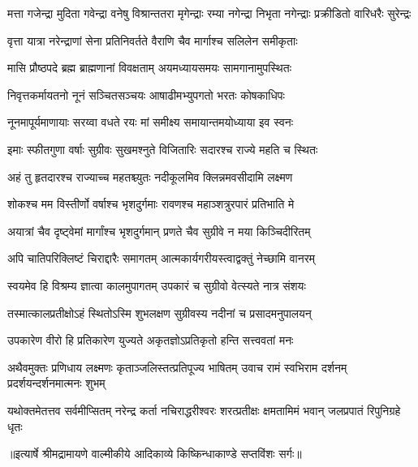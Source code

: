 \fourlineindentedshloka
{मत्ता गजेन्द्रा मुदिता गवेन्द्रा}
{वनेषु विश्रान्ततरा मृगेन्द्राः}
{रम्या नगेन्द्रा निभृता नगेन्द्राः}
{प्रक्रीडितो वारिधरैः सुरेन्द्रः} %

\twolineshloka
{वृत्ता यात्रा नरेन्द्राणां सेना प्रतिनिवर्तते}
{वैराणि चैव मार्गाश्च सलिलेन समीकृताः} %

\twolineshloka
{मासि प्रौष्ठपदे ब्रह्म ब्राह्मणानां विवक्षताम्}
{अयमध्यायसमयः सामगानामुपस्थितः} %

\twolineshloka
{निवृत्तकर्मायतनो नूनं सञ्चितसञ्चयः}
{आषाढीमभ्युपगतो भरतः कोषकाधिपः} %

\twolineshloka
{नूनमापूर्यमाणायाः सरय्वा वधते रयः}
{मां समीक्ष्य समायान्तमयोध्याया इव स्वनः} %

\twolineshloka
{इमाः स्फीतगुणा वर्षाः सुग्रीवः सुखमश्नुते}
{विजितारिः सदारश्च राज्ये महति च स्थितः} %

\twolineshloka
{अहं तु हृतदारश्च राज्याच्च महतश्च्युतः}
{नदीकूलमिव क्लिन्नमवसीदामि लक्ष्मण} %

\twolineshloka
{शोकश्च मम विस्तीर्णो वर्षाश्च भृशदुर्गमाः}
{रावणश्च महाञ्शत्रुरपारं प्रतिभाति मे} %

\twolineshloka
{अयात्रां चैव दृष्ट्वेमां मार्गांश्च भृशदुर्गमान्}
{प्रणते चैव सुग्रीवे न मया किञ्चिदीरितम्} %

\twolineshloka
{अपि चातिपरिक्लिष्टं चिराद्दारैः समागतम्}
{आत्मकार्यगरीयस्त्वाद्वक्तुं नेच्छामि वानरम्} %

\twolineshloka
{स्वयमेव हि विश्रम्य ज्ञात्वा कालमुपागतम्}
{उपकारं च सुग्रीवो वेत्स्यते नात्र संशयः} %

\twolineshloka
{तस्मात्कालप्रतीक्षोऽहं स्थितोऽस्मि शुभलक्षण}
{सुग्रीवस्य नदीनां च प्रसादमनुपालयन्} %

\twolineshloka
{उपकारेण वीरो हि प्रतिकारेण युज्यते}
{अकृतज्ञोऽप्रतिकृतो हन्ति सत्त्ववतां मनः} %

\fourlineindentedshloka
{अथैवमुक्तः प्रणिधाय लक्ष्मणः}
{कृताञ्जलिस्तत्प्रतिपूज्य भाषितम्}
{उवाच रामं स्वभिराम दर्शनम्}
{प्रदर्शयन्दर्शनमात्मनः शुभम्} %

\fourlineindentedshloka
{यथोक्तमेतत्तव सर्वमीप्सितम्}
{नरेन्द्र कर्ता नचिराद्धरीश्वरः}
{शरत्प्रतीक्षः क्षमतामिमं भवान्}
{जलप्रपातं रिपुनिग्रहे धृतः} %


{॥इत्यार्षे श्रीमद्रामायणे वाल्मीकीये आदिकाव्ये किष्किन्धाकाण्डे सप्तविंशः सर्गः॥}


